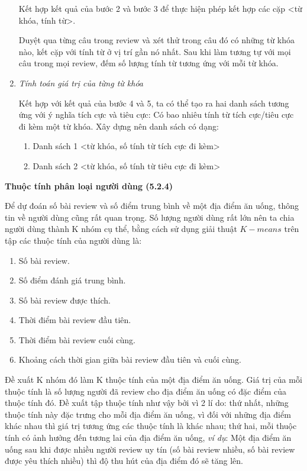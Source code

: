 \documentclass[12pt]{extarticle}
\begin{document}
\begin{enumerate}
						\par Kết hợp kết quả của bước 2 và bước 3 để thực hiện phép kết hợp các cặp <từ khóa, tính từ>. 	
						\par Duyệt qua từng câu trong review và xét thử trong câu đó có những từ khóa nào, kết cặp với tính từ ở vị trí gần nó nhất. Sau khi làm tương tự với mọi câu trong mọi review, đếm số lượng tính từ tương ứng với mỗi từ khóa.
					\item \textit{Tính toán giá trị của từng từ khóa}
						\par Kết hợp với kết quả của bước 4 và 5, ta có thể tạo ra hai danh sách tương ứng với ý nghĩa tích cực và tiêu cực: Có bao nhiêu tính từ tích cực/tiêu cực đi kèm một từ khóa. Xây dựng nên danh sách có dạng:
						\begin{enumerate}
							\item Danh sách 1 <từ khóa, số tính từ tích cực đi kèm>
							\item Danh sách 2 <từ khóa, số tính từ tiêu cực đi kèm>
						\end{enumerate}
				\end{enumerate}
			\par \textbf{Thuộc tính phân loại người dùng (5.2.4)}
				\par Để dự đoán số bài review và số điểm trung bình về một địa điểm ăn uống, thông tin về người dùng cũng rất quan trọng. Số lượng người dùng rất lớn nên ta chia người dùng thành K nhóm cụ thể, bằng cách sử dụng giải thuật $K-means$ trên tập các thuộc tính của người dùng là:
				\begin{enumerate}
					\item Số bài review.
					\item Số điểm đánh giá trung bình.
					\item Số bài review được thích.
					\item Thời điểm bài review đầu tiên.
					\item Thời điểm bài review cuối cùng.
					\item Khoảng cách thời gian giữa bài review đầu tiên và cuối cùng.
				\end{enumerate}
				\par Đề xuất K nhóm đó làm K thuộc tính của một địa điểm ăn uống. Giá trị của mỗi thuộc tính là số lượng người đã review cho địa điểm ăn uống có đặc điểm của thuộc tính đó. Đề xuất tập thuộc tính như vậy bởi vì 2 lí do: thứ nhất, những thuộc tính này đặc trưng cho mỗi địa điểm ăn uống, vì đối với những địa điểm khác nhau thì giá trị tương ứng các thuộc tính là khác nhau; thứ hai, mỗi thuộc tính có ảnh hưởng đến tương lai của địa điểm ăn uống, \textit{ví dụ}: Một địa điểm ăn uống sau khi được nhiều người review uy tín (số bài review nhiều, số bài review được yêu thích nhiều) thì độ thu hút của địa điểm đó sẽ tăng lên.  
\end{document}
